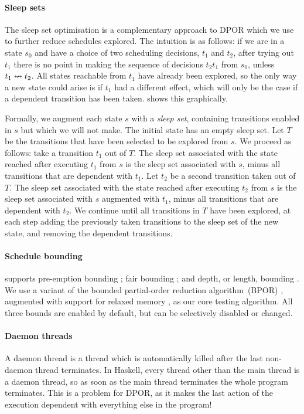 \paragraph{Sleep sets}
The sleep set optimisation \parencite{godefroid1996} is a complementary
approach to DPOR which we use to further reduce schedules explored.
The intuition is as follows: if we are in a state $s_{0}$ and have a
choice of two scheduling decisions, $t_{1}$ and $t_{2}$, after trying
out $t_{1}$ there is no point in making the sequence of decisions
$t_{2}t_{1}$ from $s_{0}$, unless $t_{1} \nleftrightarrow t_{2}$.  All
states reachable from $t_{1}$ have already been explored, so the only
way a new state could arise is if $t_{1}$ had a different effect,
which will only be the case if a dependent transition has been taken.
 shows this graphically.

Formally, we augment each state $s$ with a \emph{sleep set},
containing transitions enabled in $s$ but which we will not make.  The
initial state has an empty sleep set.  Let $T$ be the transitions that
have been selected to be explored from $s$.  We proceed as follows:
take a transition $t_{1}$ out of $T$.  The sleep set associated with
the state reached after executing $t_{1}$ from $s$ is the sleep set
associated with $s$, minus all transitions that are dependent with
$t_{1}$.  Let $t_{2}$ be a second transition taken out of $T$.  The
sleep set associated with the state reached after executing $t_{2}$
from $s$ is the sleep set associated with $s$ augmented with $t_{1}$,
minus all transitions that are dependent with $t_{2}$.  We continue
until all transitions in $T$ have been explored, at each step adding
the previously taken transitions to the sleep set of the new state,
and removing the dependent transitions.

\paragraph{Schedule bounding}
\dejafu{} supports pre-emption bounding \parencite{musuvathi2007}; fair
bounding \parencite{musuvathi2008}; and depth, or length,
bounding \parencite{russell2002}.  We use a variant of the bounded
partial-order reduction algorithm~(BPOR) \parencite{coons2013}, augmented
with support for relaxed memory \parencite{zhang2015}, as our core testing
algorithm.  All three bounds are enabled by default, but can be
selectively disabled or changed.

\paragraph{Daemon threads}
A daemon thread is a thread which is automatically killed after the
last non-daemon thread terminates.  In Haskell, every thread other
than the main thread is a daemon thread, so as soon as the main thread
terminates the whole program terminates.  This is a problem for DPOR,
as it makes the last action of the execution dependent with everything
else in the program!

